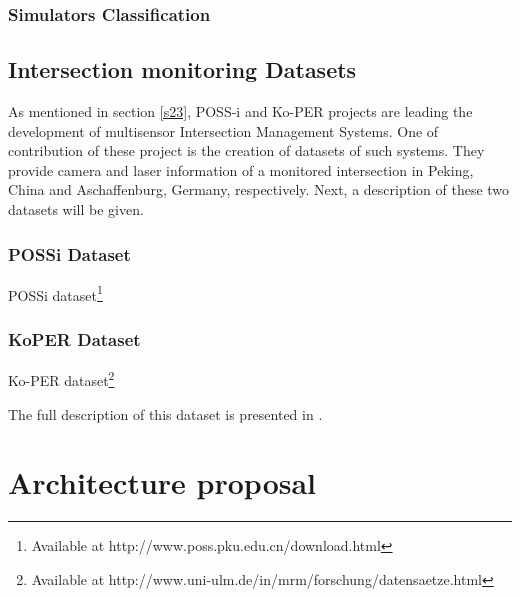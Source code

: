 \subsubsection{Simulators Classification}
\subsection{Intersection monitoring Datasets}

As mentioned in section \ref{s23}, POSS-i and Ko-PER projects are leading the development of multisensor Intersection Management Systems. One of contribution of these project is the creation of datasets of such systems. They provide camera and laser information of a monitored intersection in Peking, China and Aschaffenburg, Germany, respectively. Next, a description of these two datasets will be given.

\subsubsection{POSSi Dataset }

POSSi dataset\footnote{Available at http://www.poss.pku.edu.cn/download.html}
\subsubsection{KoPER Dataset }

Ko-PER dataset\footnote{Available at http://www.uni-ulm.de/in/mrm/forschung/datensaetze.html}

The full description of this dataset is presented in \cite{Strigel2014}.

\section{Architecture proposal}